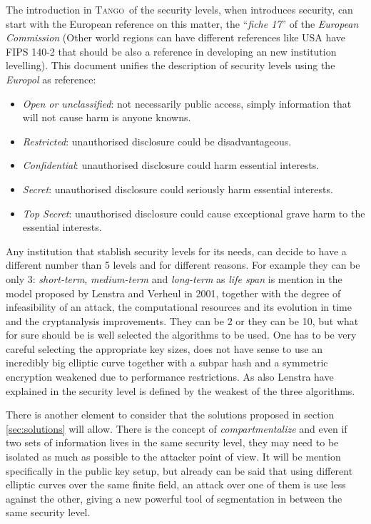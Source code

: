 \documentclass[10pt,a4paper,twoside]{llncs}
\newcommand{\tango}{\textsc{Tango}}
\begin{document}
The introduction in \tango\, of the security levels, when introduces security, can start with the European reference on this matter, the ``\emph{fiche 17}''\cite{fiche17EU} of the \emph{European Commission} (Other world regions can have different references like USA have FIPS 140-2 \cite{NIST140-2} that should be also a reference in developing an new institution levelling). This document unifies the description of security levels using the \emph{Europol} as reference:

\begin{itemize}
    \item \emph{Open or unclassified}: not necessarily public access, simply information that will not cause harm is anyone knowns.
    \item \emph{Restricted}: unauthorised disclosure could be disadvantageous.
    \item \emph{Confidential}: unauthorised disclosure could harm essential interests.
    \item \emph{Secret}: unauthorised disclosure could seriously harm essential interests.
    \item \emph{Top Secret}: unauthorised disclosure could cause exceptional grave harm to the essential interests.
\end{itemize}

Any institution that stablish security levels for its needs, can decide to have a different number than 5 levels and for different reasons. For example they can be only 3: \emph{short-term}, \emph{medium-term} and \emph{long-term} as \emph{life span} is mention in the model proposed by Lenstra and Verheul \cite{lenstra2001selecting} in 2001, together with the degree of infeasibility of an attack, the computational resources and its evolution in time and the cryptanalysis improvements. They can be 2 or they can be 10, but what for sure should be is well selected the algorithms to be used. One has to be very careful selecting the appropriate key sizes, does not have sense to use an incredibly big elliptic curve together with a subpar hash and a symmetric encryption weakened due to performance restrictions. As also Lenstra have explained in \cite{lenstra2004key} the security level is defined by the weakest of the three algorithms.

There is another element to consider that the solutions proposed in section \ref{sec:solutions} will allow. There is the concept of \emph{compartmentalize} and even if two sets of information lives in the same security level, they may need to be isolated as much as possible to the attacker point of view. It will be mention specifically in the public key setup, but already can be said that using different elliptic curves over the same finite field, an attack over one of them is use less against the other, giving a new powerful tool of segmentation in between the same security level.
\end{document}
